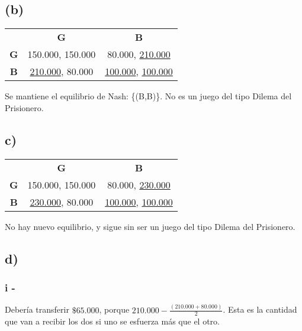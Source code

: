 \documentclass{article}
\newcommand{\ulcolor}[2][Red]{\setulcolor{#1}\ul{#2}}
\begin{document}
        \subsection*{(b)}
            \begin{table}[h]
                \centering
                \begin{tabular}{ccc}
                    & \textbf{G} & \textbf{B}\\
                    \textbf{G} & 150.000, 150.000 & 80.000, \ulcolor[Blue]{210.000}\\
                    \textbf{B} & \ulcolor[Red]{210.000}, 80.000 & \ulcolor[Red]{100.000}, \ulcolor[Blue]{100.000}\\
                \end{tabular}
            \end{table}
            Se mantiene el equilibrio de Nash: \{(B,B)\}. No es un juego del tipo Dilema del Prisionero.
            
        \subsection*{c)}
            \begin{table}[h]
                \centering
                \begin{tabular}{ccc}
                    & \textbf{G} & \textbf{B}\\
                    \textbf{G} & 150.000, 150.000 & 80.000, \ulcolor[Blue]{230.000}\\
                    \textbf{B} & \ulcolor[Red]{230.000}, 80.000 & \ulcolor[Red]{100.000}, \ulcolor[Blue]{100.000}\\
                \end{tabular}
            \end{table}
            No hay nuevo equilibrio, y sigue sin ser un juego del tipo Dilema del Prisionero.

        \subsection*{d)}
            \subsubsection*{i -}
                Debería transferir $\$65.000$, porque $210.000 - \frac{(210.000+80.000)}{2}$. Esta es la cantidad que van a recibir los dos si uno se esfuerza más que el otro.
\end{document}
